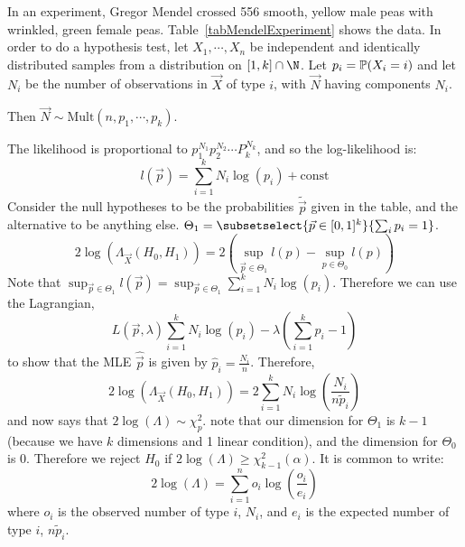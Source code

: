 \documentclass[../Main.tex]{subfiles}
\begin{document}
\begin{example}
    In an experiment, Gregor Mendel crossed 556 smooth, yellow male peas with wrinkled, green female peas. Table~\ref{tabMendelExperiment} shows the data. In order to do a hypothesis test, let $X_1, \cdots, X_n$ be independent and identically distributed samples from a distribution on $[1, k] \cap \N$. Let $p_i = \P(X_i = i)$ and let $N_i$ be the number of observations in $\vec{X}$ of type $i$, with $\vec{N}$ having components $N_i$.

    Then $\vec{N} \sim \text{Mult}(n, p_1, \cdots, p_k)$.

    The likelihood is proportional to $p_1^{N_1} p_2^{N_2} \cdots P_k^{N_k}$, and so the log-likelihood is:
    \begin{equation*}
        l(\vec{p}) = \sum_{i=1}^{k} N_i \log(p_i) + \text{const}
    \end{equation*}
    Consider the null hypotheses to be the probabilities $\tilde{\vec{p}}$ given in the table, and the alternative to be anything else. $\Theta_1 = \subsetselect{\vec{p} \in [0, 1]^k}{\sum_i p_i = 1}$.
    \begin{equation*}
        2\log(\Lambda_{\vec{X}}(H_0, H_1)) = 2\left(\sup_{\vec{p} \in \Theta_1} l(p) - \sup_{p \in \Theta_0} l(p)\right)
    \end{equation*}
    Note that $\sup_{\vec{p} \in \Theta_1} l(\vec{p}) = \sup_{\vec{p} \in\Theta_1} \sum_{i=1}^{k} N_i \log(p_i)$. Therefore we can use the Lagrangian,
    \begin{equation*}
        L(\vec{p}, \lambda) \sum_{i=1}^{k} N_i \log(p_i) - \lambda \left(\sum_{i=1}^{k} p_i - 1\right)
    \end{equation*}
    to show that the MLE $\hat{\vec{p}}$ is given by $\hat{p}_i = \frac{N_i}{n}$. Therefore,
    \begin{equation*}
        2\log(\Lambda_{\vec{X}}(H_0, H_1)) = 2 \sum_{i=1}^{k} N_i \log\left(\frac{N_i}{n \tilde{p}_i}\right)
    \end{equation*}
    and now  says that $2\log(\Lambda) \sim \chi_p^2$. note that our dimension for $\Theta_1$ is $k - 1$ (because we have $k$ dimensions and 1 linear condition), and the dimension for $\Theta_0$ is $0$. Therefore we reject $H_0$ if $2\log(\Lambda) \geq \chi_{k-1}^2(\alpha)$. It is common to write:
    \begin{equation*}
        2\log(\Lambda) = \sum_{i=1}^{n} o_i \log\left(\frac{o_i}{e_i}\right)
    \end{equation*}
    where $o_i$ is the observed number of type $i$, $N_i$, and $e_i$ is the expected number of type $i$, $n \tilde{p}_i$.
    

\end{example}
\end{document}

